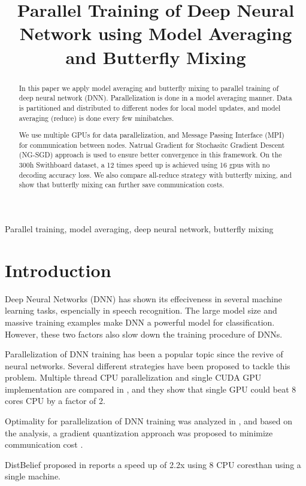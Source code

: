 \documentclass{article}
\title{Parallel Training of Deep Neural Network using Model Averaging and Butterfly Mixing}
\begin{document}
%
\maketitle
%
\begin{abstract}
In this paper we apply model averaging and butterfly mixing to parallel training of deep neural network (DNN). 
Parallelization is done in a model averaging manner. Data is partitioned and distributed to different nodes for 
local model updates, and model averaging (reduce) is done every few minibatches. 

We use multiple GPUs for data parallelization, and Message Passing Interface (MPI) for communication between nodes. 
Natrual Gradient for Stochasitc Gradient Descent (NG-SGD) approach is used to ensure better convergence in this framework. On the
300h Swithboard dataset, a 12 times speed up is achieved using 16 gpus with no decoding accuracy loss. We also 
compare all-reduce strategy with butterfly mixing, and show that butterfly mixing can further save communication costs.

\end{abstract}
%
\begin{keywords}
Parallel training, model averaging, deep neural network, butterfly mixing
\end{keywords}
%
\section{Introduction}
\label{sec:intro}
Deep Neural Networks (DNN) has shown its effeciveness in several machine learning tasks, espencially in speech
recognition. The large model size and massive training examples make DNN a powerful model for classification. However,
these two factors also slow down the training procedure of DNNs.

Parallelization of DNN training has been a popular topic since the revive of neural networks. Several different strategies
have been proposed to tackle this problem. Multiple thread CPU parallelization and single CUDA GPU implementation are compared
in \cite{scanzio2010parallel,vesely2010parallel}, and they show that single GPU could beat 8 cores CPU by a factor of 2.

Optimality for parallelization of DNN training was analyzed in \cite{seide2014parallelizability}, and based on the analysis, 
a gradient quantization approach was proposed to minimize communication cost \cite{seide20141}.

DistBelief proposed in \cite{dean2012large} reports a speed up of 2.2x using 8 CPU coresthan using a
single machine.
\end{document}
